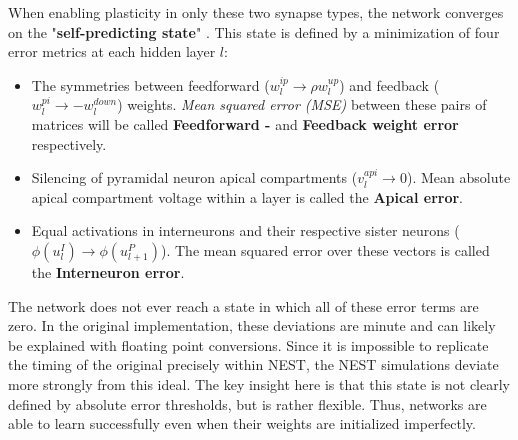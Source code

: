 When enabling plasticity in only these two synapse types, the network converges on the "\textbf{self-predicting state}"
\citep{sacramento2018dendritic}. This state is defined by a minimization of four error metrics at each hidden layer $l$:

\begin{itemize}
  \item The symmetries between feedforward ($w_l^{ip} \rightarrow \rho w_l^{up}$) and feedback ($w_l^{pi} \rightarrow
        -w_l^{down}$) weights. \textit{Mean squared error (MSE)} between these pairs of matrices will be called \textbf{Feedforward - }
        and \textbf{Feedback weight error} respectively.
  \item Silencing of pyramidal neuron apical compartments ($v_l^{api} \rightarrow 0$). Mean absolute apical compartment
        voltage within a layer is called the \textbf{Apical error}.
  \item Equal activations in interneurons and their respective sister neurons ($\phi (u_l^I) \rightarrow \phi
        (u_{l+1}^P)$). The mean squared error over these vectors is called the \textbf{Interneuron error}.
\end{itemize}

The network does not ever reach a state in which all of these error terms are zero. In the original
implementation, these deviations are minute and can likely be explained with floating point conversions. Since it is
impossible to replicate the timing of the original precisely within NEST, the NEST simulations deviate more strongly
from this ideal. The key insight here is that this state is not clearly defined by absolute error thresholds, but is
rather flexible. Thus, networks are able to learn successfully even when their weights are initialized imperfectly. 


